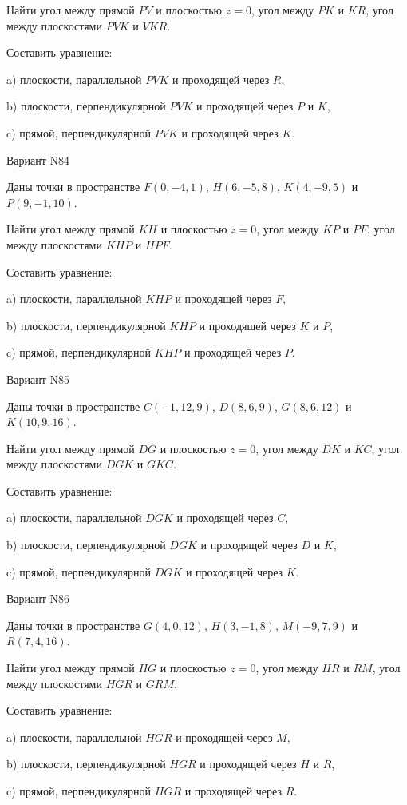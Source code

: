 \documentclass[11pt]{report}
\begin{document}
Найти угол между прямой $PV$ и плоскостью $z = 0$, угол между $PK$ и $KR$, угол между плоскостями $PVK$ 
и $VKR$.

Составить уравнение: 

a) плоскости, параллельной $PVK$ и проходящей через $R$,

b) плоскости, перпендикулярной $PVK$ и проходящей через $P$ и $K$,

c) прямой, перпендикулярной $PVK$ и проходящей через $K$.

Вариант N84

Даны точки в пространстве
$F(0, -4, 1)$, $H(6, -5, 8)$, $K(4, -9, 5)$ и
$P(9, -1, 10)$.

Найти угол между прямой $KH$ и плоскостью $z = 0$, угол между $KP$ и $PF$, угол между плоскостями $KHP$ 
и $HPF$.

Составить уравнение: 

a) плоскости, параллельной $KHP$ и проходящей через $F$,

b) плоскости, перпендикулярной $KHP$ и проходящей через $K$ и $P$,

c) прямой, перпендикулярной $KHP$ и проходящей через $P$.

Вариант N85

Даны точки в пространстве
$C(-1, 12, 9)$, $D(8, 6, 9)$, $G(8, 6, 12)$ и
$K(10, 9, 16)$.

Найти угол между прямой $DG$ и плоскостью $z = 0$, угол между $DK$ и $KC$, угол между плоскостями $DGK$ 
и $GKC$.

Составить уравнение: 

a) плоскости, параллельной $DGK$ и проходящей через $C$,

b) плоскости, перпендикулярной $DGK$ и проходящей через $D$ и $K$,

c) прямой, перпендикулярной $DGK$ и проходящей через $K$.

Вариант N86

Даны точки в пространстве
$G(4, 0, 12)$, $H(3, -1, 8)$, $M(-9, 7, 9)$ и
$R(7, 4, 16)$.

Найти угол между прямой $HG$ и плоскостью $z = 0$, угол между $HR$ и $RM$, угол между плоскостями $HGR$ 
и $GRM$.

Составить уравнение: 

a) плоскости, параллельной $HGR$ и проходящей через $M$,

b) плоскости, перпендикулярной $HGR$ и проходящей через $H$ и $R$,

c) прямой, перпендикулярной $HGR$ и проходящей через $R$.
\end{document}
